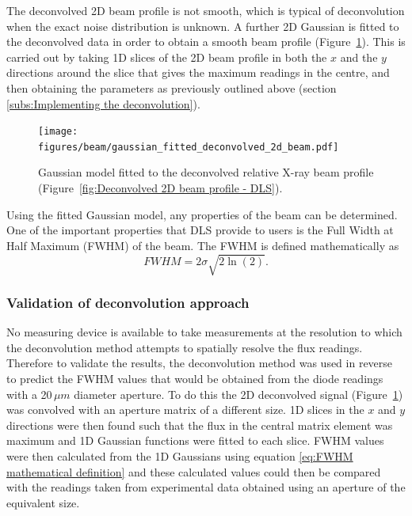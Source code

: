 The deconvolved 2D beam profile is not smooth, which is typical of deconvolution when the exact noise distribution is unknown.
A further 2D Gaussian is fitted to the deconvolved data in order to obtain a smooth beam profile (Figure~\ref{fig:Gaussian model fitted to the 2D deconvolved profile - DLS}).
This is carried out by taking 1D slices of the 2D beam profile in both the $x$ and the $y$ directions around the slice that gives the maximum readings in the centre, and then obtaining the parameters as previously outlined above (section \ref{subs:Implementing the deconvolution}).
\begin{figure}
    \centering
    \texttt{[image: figures/beam/gaussian\_fitted\_deconvolved\_2d\_beam.pdf]}
    \caption{Gaussian model fitted to the deconvolved relative X-ray beam profile (Figure~\ref{fig:Deconvolved 2D beam profile - DLS}).}
    \label{fig:Gaussian model fitted to the 2D deconvolved profile - DLS}
\end{figure}

Using the fitted Gaussian model, any properties of the beam can be determined.
One of the important properties that DLS provide to users is the Full Width at Half Maximum (FWHM) of the beam. The FWHM is defined mathematically as
\begin{equation}
FWHM = 2 \sigma \sqrt{2\ln(2)}.
\label{eq:FWHM mathematical definition}
\end{equation}

\subsubsection{Validation of deconvolution approach}
\label{subs:Validation of deconvolution approach}
No measuring device is available to take measurements at the resolution to which the deconvolution method attempts to spatially resolve the flux readings.
Therefore to validate the results, the deconvolution method was used in reverse to predict the FWHM values that would be obtained from the diode readings with a 20$\,\mu m$ diameter aperture.
To do this the 2D deconvolved signal (Figure~\ref{fig:Gaussian model fitted to the 2D deconvolved profile - DLS}) was convolved with an aperture matrix of a different size.
1D slices in the $x$ and $y$ directions were then found such that the flux in the central matrix element was maximum and 1D Gaussian functions were fitted to each slice.
FWHM values were then calculated from the 1D Gaussians using equation \ref{eq:FWHM mathematical definition} and these calculated values could then be compared with the readings taken from experimental data obtained using an aperture of the equivalent size.

